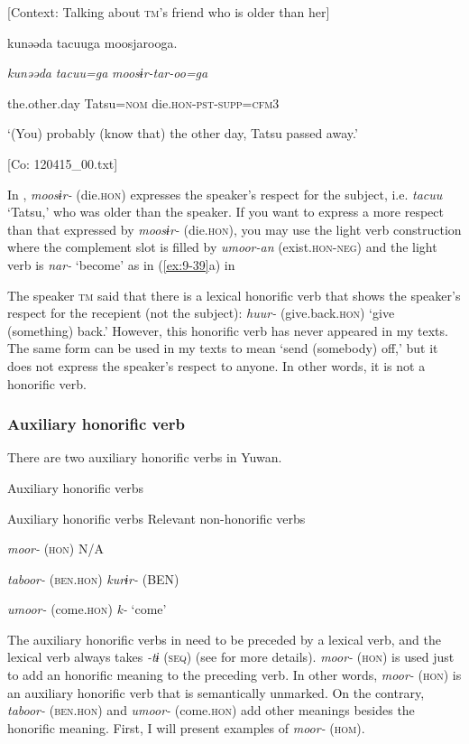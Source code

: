   [Context: Talking about \textsc{tm}’s friend who is older than her]

  {\TM}
\glll  kunəəda  tacuuga  moosjarooga.

    \textit{kunəəda}  \textit{tacuu=ga}  \textit{moosɨr{}-tar-oo=ga}

    the.other.day  Tatsu=\textsc{nom}  die.\textsc{hon}-\textsc{pst}-\textsc{supp}=\textsc{cfm}3

    ‘(You) probably (know that) the other day, Tatsu passed away.’

    [Co: 120415\_00.txt]
\z

In , \textit{moosɨr-} (die.\textsc{hon}) expresses the speaker’s respect for the subject, i.e. \textit{tacuu} ‘Tatsu,’ who was older than the speaker. If you want to express a more respect than that expressed by \textit{moosɨr-} (die.\textsc{hon}), you may use the light verb construction where the complement slot is filled by \textit{umoor-an} (exist.\textsc{hon}-\textsc{neg}) and the light verb is \textit{nar-} ‘become’ as in (\ref{ex:9-39}a) in 

  The speaker \textsc{tm} said that there is a lexical honorific verb that shows the speaker’s respect for the recepient (not the subject): \textit{huur-} (give.back.\textsc{hon}) ‘give (something) back.’ However, this honorific verb has never appeared in my texts. The same form can be used in my texts to mean ‘send (somebody) off,’ but it does not express the speaker’s respect to anyone. In other words, it is not a honorific verb.

\subsubsection{Auxiliary honorific verb}

There are two auxiliary honorific verbs in Yuwan.

\begin{table}
\caption{\label{tab:key:73}}\textmd{ Auxiliary honorific verbs}

Auxiliary honorific verbs  Relevant non-honorific verbs

\textit{moor-} (\textsc{hon})  N/A

\textit{taboor-} (\textsc{ben}.\textsc{hon})  \textit{kurɨr-} (BEN)

\textit{umoor-} (come.\textsc{hon})  \textit{k-} ‘come’
\end{table}

The auxiliary honorific verbs in  need to be preceded by a lexical verb, and the lexical verb always takes \textit{{}-tɨ} (\textsc{seq}) (see  for more details). \textit{moor-} (\textsc{hon}) is used just to add an honorific meaning to the preceding verb. In other words, \textit{moor-} (\textsc{hon}) is an auxiliary honorific verb that is semantically unmarked. On the contrary, \textit{taboor-} (\textsc{ben}.\textsc{hon}) and \textit{umoor-} (come.\textsc{hon}) add other meanings besides the honorific meaning. First, I will present examples of \textit{moor-} (\textsc{hom}).

